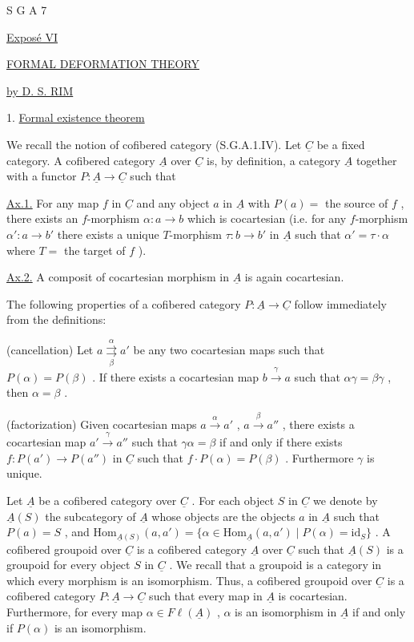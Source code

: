 


S G A  7


\underline{Exposé VI}


\underline{\underline{FORMAL DEFORMATION THEORY}}


\underline{by  D. S. RIM}


1. \underline{Formal existence theorem}

We recall the notion of cofibered category (S.G.A.1.IV). Let  $\underline{C}$  be a fixed category. A cofibered category  $\underline{A}$  over  $\underline{C}$  is, by definition, a category  $\underline{A}$  together with a functor  $P : \underline{A} \to \underline{C}$  such that

\underline{Ax.1.}  For any map  $f$  in  $\underline{C}$  and any object  $a$  in  $\underline{A}$  with  $P(a) =$ the source of  $f$  , there exists an  $f$-morphism  $\alpha : a \to b$  which is cocartesian (i.e. for any  $f$-morphism  $\alpha' : a \to b'$  there exists a unique  $T$-morphism  $\tau : b \to b'$  in  $\underline{A}$  such that  $\alpha' = \tau\cdot\alpha$  where  $T =$ the target of  $f$ ).

\underline{Ax.2.}  A composit of cocartesian morphism in  $\underline{A}$  is again cocartesian.

The following properties of a cofibered category  $P : \underline{A} \to \underline{C}$  follow immediately from the definitions:

(cancellation)  Let  $a \overset{\alpha}{\underset{\beta}{\rightrightarrows}} a'$  be any two cocartesian maps such that  $P(\alpha) = P(\beta)$  . If there exists a cocartesian map  $b \overset{\gamma}{\to} a$  such that  $\alpha\gamma = \beta\gamma$ , then  $\alpha = \beta$  .

(factorization)  Given cocartesian maps  $a \overset{\alpha}{\to} a'$  ,  $a \overset{\beta}{\to} a''$  , there exists a cocartesian map  $a' \overset{\gamma}{\to} a''$  such that  $\gamma\alpha = \beta$  if and only if there exists  $f : P(a') \to P(a'')$  in  $\underline{C}$  such that  $f\cdot P(\alpha) = P(\beta)$  . Furthermore  $\gamma$  is unique.

Let  $\underline{A}$  be a cofibered category over  $\underline{C}$  . For each object  $S$  in  $\underline{C}$  we denote by  $\underline{A}(S)$  the subcategory of  $\underline{A}$  whose objects are the objects  $a$  in  $\underline{A}$  such that  $P(a) = S$  , and  $\mathrm{Hom}_{\underline{A}(S)}(a,a') = \{\alpha \in \mathrm{Hom}_{\underline{A}}(a,a') \mid P(\alpha) = \mathrm{id}_S\}$  . A cofibered groupoid over  $\underline{C}$  is a cofibered category  $\underline{A}$  over  $\underline{C}$  such that  $\underline{A}(S)$
is a groupoid for every object  $S$  in  $\underline{C}$ . We recall that a groupoid is a category in which every morphism is an isomorphism.  Thus, a cofibered groupoid over $\underline{C}$  is a cofibered category  $P : \underline{A} \to \underline{C}$  such that every map in  $\underline{A}$  is cocartesian. Furthermore, for every map  $\alpha \in F\ell(\underline{A})$  ,  $\alpha$  is an isomorphism in  $\underline{A}$  if and only if  $P(\alpha)$  is an isomorphism.

